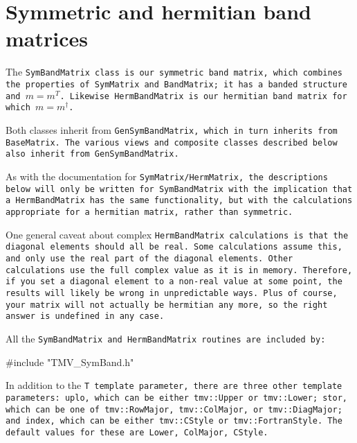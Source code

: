 
\section{Symmetric and hermitian band matrices}
\label{SymBandMatrix}

The \tt{SymBandMatrix} class is our symmetric band matrix, which combines
the properties of SymMatrix and BandMatrix; it has a banded structure and
$m = m^T$.  Likewise \tt{HermBandMatrix} is our hermitian band matrix for
which $m = m^\dagger$.

Both classes inherit from \tt{GenSymBandMatrix}, which in turn inherits from 
\tt{BaseMatrix}.  The various views and composite classes described below 
also inherit from \tt{GenSymBandMatrix}.

As with the documentation for \tt{SymMatrix}/\tt{HermMatrix}, the descriptions
below will only be written for \tt{SymBandMatrix} with the implication
that a \tt{HermBandMatrix} has the same functionality, but with the calculations
appropriate for a hermitian matrix, rather than symmetric.

One general caveat about complex \tt{HermBandMatrix} calculations is that 
the diagonal elements should all be real.  Some calculations assume this, and 
only use the real part of the diagonal elements.  Other calculations use the 
full complex value as it is in memory.  Therefore, if you set a diagonal element
to a non-real value at some point, the results will likely be wrong in 
unpredictable ways.  Plus of course, your matrix will not actually be 
hermitian any more, so the right answer is undefined in any case.

All the \tt{SymBandMatrix} and \tt{HermBandMatrix} routines are included by:
\begin{tmvcode}
#include "TMV_SymBand.h"
\end{tmvcode}

In addition to the \tt{T} template parameter, there are three other template 
parameters: \tt{uplo}, which can be either \tt{tmv::Upper} or \tt{tmv::Lower};
\tt{stor}, which can be one of \tt{tmv::RowMajor}, \tt{tmv::ColMajor}, or 
\tt{tmv::DiagMajor}; and \tt{index}, which can be either \tt{tmv::CStyle}
or \tt{tmv::FortranStyle}.  The default values for these are 
\tt{Lower}, \tt{ColMajor}, \tt{CStyle}.

